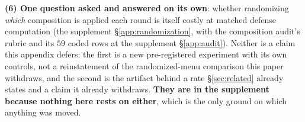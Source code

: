 \documentclass{article}
\begin{document}
\noindent \textbf{(6) One question asked and answered on its own}: whether randomizing \emph{which}
composition is applied each round is itself costly at matched defense computation
(the supplement §\ref{app:randomization}, with the composition audit's rubric and its $59$ coded rows
at the supplement §\ref{app:audit}). Neither is a claim this appendix defers: the first is a new
pre-registered experiment with its own controls, not a reinstatement of the randomized-menu comparison
this paper withdraws, and the second is the artifact behind a rate §\ref{sec:related} already states
and a claim it already withdraws. \textbf{They are in the supplement because nothing here rests on
either}, which is the only ground on which anything was moved.

\end{document}
